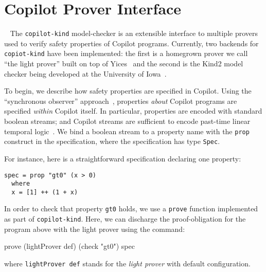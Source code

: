 \section{Copilot Prover Interface}~\label{sec:prover} 
The \texttt{copilot-kind} model-checker is an extensible interface to multiple
provers used to verify safety properties of Copilot
programs. Currently, two backends for \texttt{copiot-kind} have been implemented: the first is a
homegrown prover we call ``the light prover'' built on top of
Yices~\cite{Dutertre:cav2014} and the second is the Kind2 model checker being developed at
the University of Iowa~\cite{kind}.

To begin, we describe how safety properties are specified in Copilot. Using the
``synchronous observer'' approach~\cite{amast93}, properties \emph{about}
Copilot programs are specified \emph{within} Copilot itself. In particular,
properties are encoded with standard boolean streams; and Copilot streams are
sufficient to encode past-time linear temporal logic~\cite{ptltl}. We bind a boolean stream
to a property name with the \texttt{prop} construct in the specification, where
the specification has type \texttt{Spec}. 

For instance, here is a straightforward specification declaring one
property:

\begin{lstlisting}[frame=single]
spec = prop "gt0" (x > 0)
  where 
  x = [1] ++ (1 + x)
\end{lstlisting}

In order  to check that property \texttt{gt0} holds, we use a \texttt{prove}
function implemented as part of \texttt{copilot-kind}.
Here, we can discharge the proof-obligation for the program above with the light prover using the command:
\begin{code}
prove (lightProver def) (check "gt0") spec
\end{code}
where \texttt{lightProver def} stands for the \emph{light prover} with
default configuration.


%
%
%  
%
%

